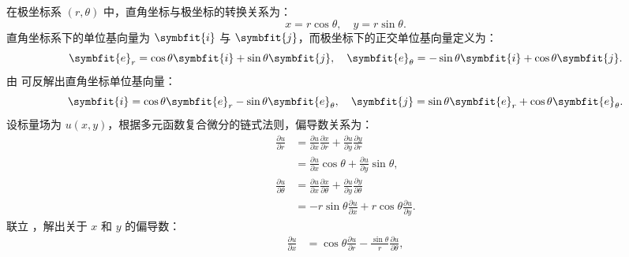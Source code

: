 \begin{solution}

    在极坐标系 $(r, \theta)$ 中，直角坐标与极坐标的转换关系为：
    \begin{equation}
        \label{eq:polar-trans-1}
        x = r \cos\theta, \quad y = r \sin\theta.
    \end{equation}
    直角坐标系下的单位基向量为 $\symbfit{i}$ 与 $\symbfit{j}$，而极坐标下的正交单位基向量定义为：
    \begin{equation}
        \label{eq:polar-unit-vectors-2}
        \symbfit{e}_r = \cos\theta \symbfit{i} + \sin\theta \symbfit{j}, \quad
        \symbfit{e}_\theta = -\sin\theta \symbfit{i} + \cos\theta \symbfit{j}.
    \end{equation}
    由  可反解出直角坐标单位基向量：
    \begin{equation}
        \label{eq:cartesian-to-polar-unit-3}
        \symbfit{i} = \cos\theta \symbfit{e}_r - \sin\theta \symbfit{e}_\theta, \quad
        \symbfit{j} = \sin\theta \symbfit{e}_r + \cos\theta \symbfit{e}_\theta.
    \end{equation}
    设标量场为 $u(x, y)$，根据多元函数复合微分的链式法则，偏导数关系为：
    \begin{equation}
        \label{eq:chain-rule-4}
        \begin{aligned}
            \frac{\partial u}{\partial r}      & = \frac{\partial u}{\partial x} \frac{\partial x}{\partial r} + \frac{\partial u}{\partial y} \frac{\partial y}{\partial r}           \\
                                               & = \frac{\partial u}{\partial x} \cos\theta + \frac{\partial u}{\partial y} \sin\theta,                                                \\
            \frac{\partial u}{\partial \theta} & = \frac{\partial u}{\partial x} \frac{\partial x}{\partial \theta} + \frac{\partial u}{\partial y} \frac{\partial y}{\partial \theta} \\
                                               & = -r \sin\theta \frac{\partial u}{\partial x} + r \cos\theta \frac{\partial u}{\partial y}.
        \end{aligned}
    \end{equation}
    联立 ，解出关于 $x$ 和 $y$ 的偏导数：
    \begin{equation}
        \label{eq:partial-xy-5}
        \begin{aligned}
            \frac{\partial u}{\partial x} & = \cos\theta \frac{\partial u}{\partial r} - \frac{\sin\theta}{r} \frac{\partial u}{\partial \theta}, \\

\end{aligned}
\end{equation}
\end{solution}
